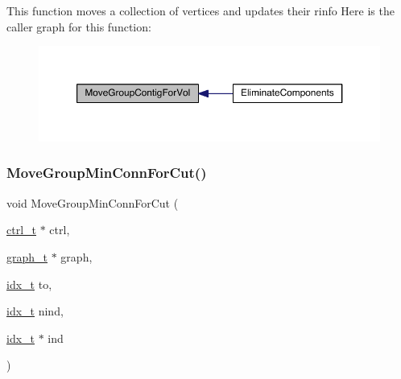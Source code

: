 This function moves a collection of vertices and updates their rinfo Here is the caller graph for this function\+:\nopagebreak
\begin{figure}[H]
\begin{center}
\leavevmode
\includegraphics[width=350pt]{a00945_ac9671fbb0e67a5e8bee0d578ebcd0382_icgraph}
\end{center}
\end{figure}
\mbox{\label{a00945_a39d997df18cf07ea8609a66db133a8b6}} 
\subsubsection{\texorpdfstring{Move\+Group\+Min\+Conn\+For\+Cut()}{MoveGroupMinConnForCut()}}
{\footnotesize\ttfamily void Move\+Group\+Min\+Conn\+For\+Cut (\begin{DoxyParamCaption}\item[{\hyperlink{a00742}{ctrl\+\_\+t} $\ast$}]{ctrl,  }\item[{\hyperlink{a00734}{graph\+\_\+t} $\ast$}]{graph,  }\item[{\hyperlink{a00876_aaa5262be3e700770163401acb0150f52}{idx\+\_\+t}}]{to,  }\item[{\hyperlink{a00876_aaa5262be3e700770163401acb0150f52}{idx\+\_\+t}}]{nind,  }\item[{\hyperlink{a00876_aaa5262be3e700770163401acb0150f52}{idx\+\_\+t} $\ast$}]{ind }\end{DoxyParamCaption})}

